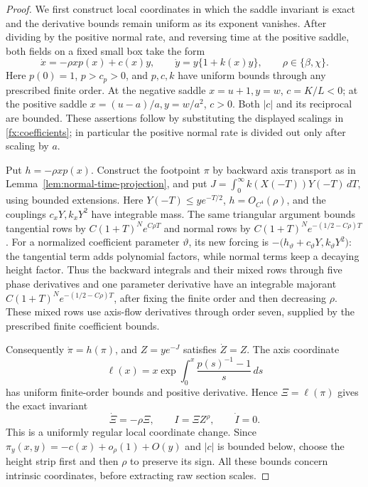 \begin{proof}
We first construct local coordinates in which the saddle invariant is
exact and the derivative bounds remain uniform as its exponent vanishes.
After dividing by the positive normal rate, and reversing time at
the positive saddle, both fields on a fixed small box take the form
\begin{equation}\label{eq:saddle-normal-time}
 \dot x=-\rho x p(x)+c(x)y,\qquad
 \dot y=y\{1+k(x)y\},\qquad \rho\in\{\beta,\chi\}.
\end{equation}
Here \(p(0)=1\), \(p>c_p>0\), and \(p,c,k\) have uniform
bounds through any prescribed finite order. At the negative saddle
\(x=u+1,y=w\), \(c=K/L<0\); at the positive saddle
\(x=(u-a)/a,y=w/a^2\), \(c>0\). Both \(|c|\) and its
reciprocal are bounded. These assertions follow by substituting the
displayed scalings in \eqref{fx:coefficients}; in particular the
positive normal rate is divided out only after scaling by \(a\).

Put \(h=-\rho xp(x)\). Construct the footpoint \(\pi\) by backward
axis transport as in Lemma~\ref{lem:normal-time-projection}, and put
\(J=\int_0^\infty k(X(-T))Y(-T)\,dT\), using bounded extensions.
Here \(Y(-T)\le ye^{-T/2}\), \(h=O_{C^4}(\rho)\), and the
couplings \(c_xY,k_xY^2\) have integrable mass. The same triangular
argument bounds tangential rows by \(C(1+T)^Ne^{C\rho T}\) and
normal rows by \(C(1+T)^Ne^{-(1/2-C\rho)T}\).
For a normalized coefficient parameter \(\vartheta\), its new forcing
is \(-\bigl(h_\vartheta+c_\vartheta Y,k_\vartheta Y^2\bigr)\):
the tangential term adds polynomial factors, while normal terms keep a
decaying height factor. Thus the backward integrals and their mixed rows
through five phase derivatives and one parameter derivative have an
integrable majorant \(C(1+T)^Ne^{-(1/2-C\rho)T}\), after fixing the
finite order and then decreasing \(\rho\). These mixed rows use axis-flow
derivatives through order seven, supplied by the prescribed finite
coefficient bounds.

Consequently \(\dot\pi=h(\pi)\), and \(Z=ye^{-J}\) satisfies
\(\dot Z=Z\). The axis coordinate
\[
 \ell(x)=x\exp\int_0^x\frac{p(s)^{-1}-1}{s}\,ds
\]
has uniform finite-order bounds and positive derivative. Hence
\(\Xi=\ell(\pi)\) gives the exact invariant
\begin{equation}\label{eq:exact-saddle-invariant}
 \dot\Xi=-\rho\Xi,\qquad I=\Xi Z^\rho,\qquad \dot I=0.
\end{equation}
This is a uniformly regular local coordinate change. Since
\(\pi_y(x,y)=-c(x)+o_\rho(1)+O(y)\) and \(|c|\) is bounded below,
choose the height strip first and then \(\rho\) to preserve its sign.
All these bounds concern intrinsic coordinates, before extracting raw
section scales.


\end{proof}
